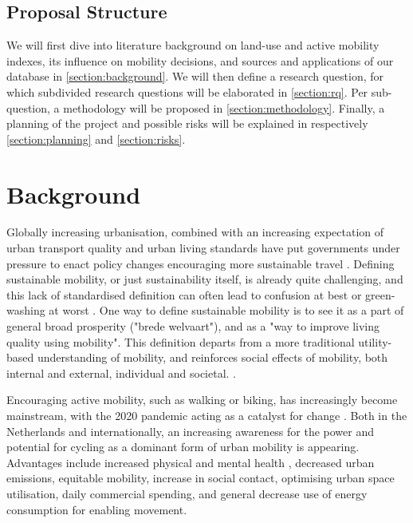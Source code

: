 \documentclass[sigconf, natbib=false, nonacm]{acmart}
\begin{document}
    \subsection{Proposal Structure}
    We will first dive into literature background on land-use and active mobility indexes, its influence on mobility decisions, and sources and applications of our database in \autoref{section:background}. We will then define a research question, for which subdivided research questions will be elaborated
    in \autoref{section:rq}. Per sub-question, a methodology will be proposed in
    \autoref{section:methodology}. Finally, a planning of the project and possible risks will
    be explained in respectively \autoref{section:planning} and \autoref{section:risks}.

\section{Background}\label{section:background}
    Globally increasing urbanisation, combined with an increasing expectation of urban transport quality and urban living standards have put governments under pressure to enact policy changes encouraging more sustainable travel \parencite{un_68_2018}. Defining sustainable mobility, or just sustainability itself, is already quite challenging, and this lack of standardised definition can often lead to confusion at best or green-washing at worst \parencite{holden_sustainable_2013, banister_sustainable_2008}. One way to define sustainable mobility is to see it as a part of general broad prosperity ("brede welvaart"), and as a "way to improve living quality using mobility". This definition departs from a more traditional utility-based understanding of mobility, and reinforces social effects of mobility, both internal and external, individual and societal. \parencite{wilmink_indicatoren_2021, snellen_brede_2021}. 
    
    Encouraging active mobility, such as walking or biking, has increasingly become mainstream, with the 2020 pandemic acting as a catalyst for change \parencite{nikitas_cycling_2021}. Both in the Netherlands and internationally, an increasing awareness for the power and potential for cycling as a dominant form of urban mobility is appearing. Advantages include increased physical and mental health \parencite{avila-palencia_effects_2018, bassett_walking_2008, sallis_active_2004}, decreased urban emissions, equitable mobility, increase in social contact, optimising urban space utilisation, daily commercial spending, and general decrease use of energy consumption for enabling movement. 
    
\end{document}
